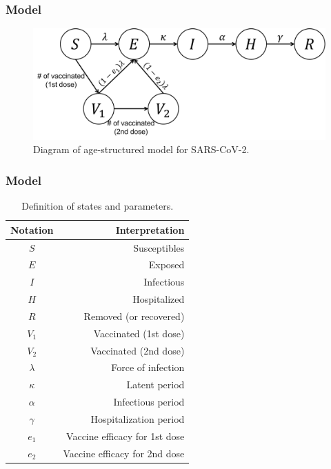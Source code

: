\documentclass[aspectratio=169, 9pt, xcolor=dvipsnames]{beamer}
\begin{document}
	\begin{frame}\frametitle{Model}
	    \begin{figure}
	    	\centering
	    	\includegraphics[width=12cm]{diagram.pdf}
	    	\caption{Diagram of age-structured model for SARS-CoV-2.}
	    \end{figure}
	\end{frame}

	\begin{frame}\frametitle{Model}
	    \begin{table}
	    	\begin{tabular}{cr}
	    		\toprule
	    		\textbf{Notation} & \textbf{Interpretation} \\
	    		\midrule
	    		$S$ & Susceptibles \\
	    		$E$ & Exposed \\
	    		$I$ & Infectious \\
	    		$H$ & Hospitalized \\
	    		$R$ & Removed (or recovered) \\
	    		$V_1$ & Vaccinated (1st dose) \\
	    		$V_2$ & Vaccinated (2nd dose) \\
	    		$\lambda$ & Force of infection \\
	    		$\kappa$ & Latent period \\
	    		$\alpha$ & Infectious period \\
	    		$\gamma$ & Hospitalization period \\
	    		$e_1$ & Vaccine efficacy for 1st dose \\
	    		$e_2$ & Vaccine efficacy for 2nd dose \\
	    		\bottomrule
	    	\end{tabular}
	    	\caption{Definition of states and parameters.}
	    \end{table}
	\end{frame}
\end{document}
